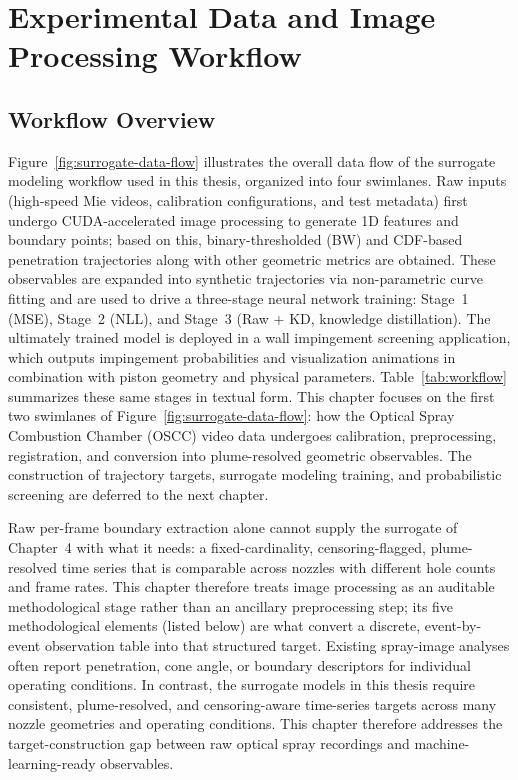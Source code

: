 \section{Experimental Data and Image Processing Workflow}

\subsection{Workflow Overview}

Figure~\ref{fig:surrogate-data-flow} illustrates the overall data flow of the surrogate modeling workflow used in this thesis, organized into four swimlanes.
Raw inputs (high-speed Mie videos, calibration configurations, and test metadata) first undergo CUDA-accelerated image processing to generate 1D features and boundary points; based on this, binary-thresholded (BW) and CDF-based penetration trajectories along with other geometric metrics are obtained.
These observables are expanded into synthetic trajectories via non-parametric curve fitting and are used to drive a three-stage neural network training: Stage~1 (MSE), Stage~2 (NLL), and Stage~3 (Raw + KD, knowledge distillation).
The ultimately trained model is deployed in a wall impingement screening application, which outputs impingement probabilities and visualization animations in combination with piston geometry and physical parameters.
Table~\ref{tab:workflow} summarizes these same stages in textual form.
This chapter focuses on the first two swimlanes of Figure~\ref{fig:surrogate-data-flow}: how the Optical Spray Combustion Chamber (OSCC) video data undergoes calibration, preprocessing, registration, and conversion into plume-resolved geometric observables.
The construction of trajectory targets, surrogate modeling training, and probabilistic screening are deferred to the next chapter.

Raw per-frame boundary extraction alone cannot supply the surrogate of Chapter~4 with what it needs: a fixed-cardinality, censoring-flagged, plume-resolved time series that is comparable across nozzles with different hole counts and frame rates.
This chapter therefore treats image processing as an auditable methodological stage rather than an ancillary preprocessing step; its five methodological elements (listed below) are what convert a discrete, event-by-event observation table into that structured target.
Existing spray-image analyses often report penetration, cone angle, or boundary descriptors for individual operating conditions.
In contrast, the surrogate models in this thesis require consistent, plume-resolved, and censoring-aware time-series targets across many nozzle geometries and operating conditions.
This chapter therefore addresses the target-construction gap between raw optical spray recordings and machine-learning-ready observables.

